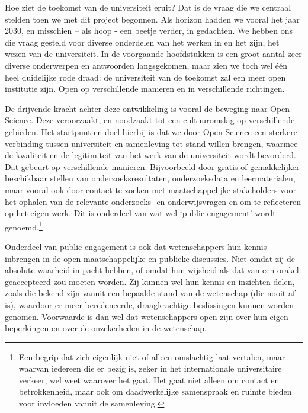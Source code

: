 \documentclass{jote-book}
\begin{document}
	Hoe ziet de toekomst van de universiteit eruit? Dat is de vraag die we centraal stelden toen we met dit project begonnen. Als horizon hadden we vooral het jaar 2030, en misschien -- als hoop - een beetje verder, in gedachten. We hebben ons die vraag gesteld voor diverse onderdelen van het werken in en het zijn, het wezen van de universiteit. In de voorgaande hoofdstukken is een groot aantal zeer diverse onderwerpen en antwoorden langsgekomen, maar zien we toch wel één heel duidelijke rode draad: de universiteit van de toekomst zal een meer open institutie zijn. Open op verschillende manieren en in verschillende richtingen.



	De drijvende kracht achter deze ontwikkeling is vooral de beweging naar Open Science. Deze veroorzaakt, en noodzaakt tot een cultuuromslag op verschillende gebieden. Het startpunt en doel hierbij is dat we door Open Science een sterkere verbinding tussen universiteit en samenleving tot stand willen brengen, waarmee de kwaliteit en de legitimiteit van het werk van de universiteit wordt bevorderd. Dat gebeurt op verschillende manieren. Bijvoorbeeld door gratis of gemakkelijker beschikbaar stellen van onderzoeksresultaten, onderzoeksdata en leermaterialen, maar vooral ook door contact te zoeken met maatschappelijke stakeholders voor het ophalen van de relevante onderzoeks- en onderwijsvragen en om te reflecteren op het eigen werk. Dit is onderdeel van wat wel ‘public engagement' wordt genoemd.\footnote{Een begrip dat zich eigenlijk niet of alleen omslachtig laat vertalen, maar waarvan iedereen die er bezig is, zeker in het internationale universitaire verkeer, wel weet waarover het gaat. Het gaat niet alleen om contact en betrokkenheid, maar ook om daadwerkelijke samenspraak en ruimte bieden voor invloeden vanuit de samenleving.}



	Onderdeel van public engagement is ook dat wetenschappers hun kennis inbrengen in de open maatschappelijke en publieke discussies. Niet omdat zij de absolute waarheid in pacht hebben, of omdat hun wijsheid als dat van een orakel geaccepteerd zou moeten worden. Zij kunnen wel hun kennis en inzichten delen, zoals die bekend zijn vanuit een bepaalde stand van de wetenschap (die nooit af is), waardoor er meer beredeneerde, draagkrachtige beslissingen kunnen worden genomen. Voorwaarde is dan wel dat wetenschappers open zijn over hun eigen beperkingen en over de onzekerheden in de wetenschap.
\end{document}

